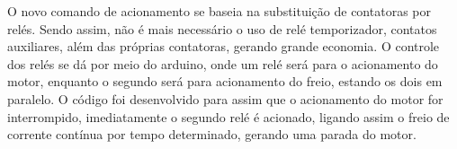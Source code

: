 O novo comando de acionamento se baseia na substituição de contatoras por relés. Sendo assim, não é mais necessário o uso de relé temporizador, contatos auxiliares, além das próprias contatoras, gerando grande economia. O controle dos relés se dá por meio do arduino, onde um relé será para o acionamento do motor, enquanto o segundo será para acionamento do freio, estando os dois em paralelo. O código foi desenvolvido para assim que o acionamento do motor for interrompido, imediatamente o segundo relé é acionado, ligando assim o freio de corrente contínua por tempo determinado, gerando uma parada do motor.